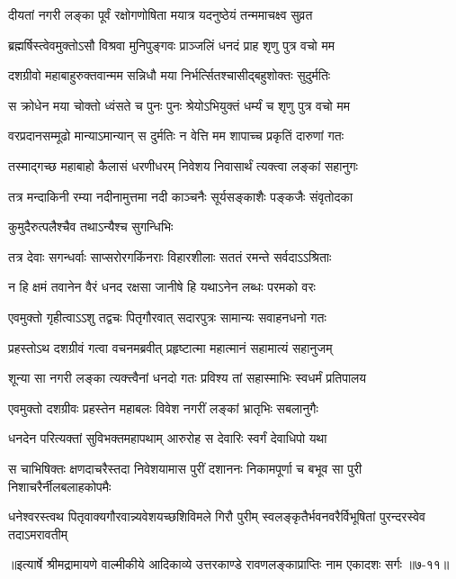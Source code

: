 \twolineshloka
{दीयतां नगरी लङ्का पूर्वं रक्षोगणोषिता}
{मयात्र यदनुष्ठेयं तन्ममाचक्ष्व सुव्रत} %

\twolineshloka
{ब्रह्मर्षिस्त्वेवमुक्तोऽसौ विश्रवा मुनिपुङ्गवः}
{प्राञ्जलिं धनदं प्राह शृणु पुत्र वचो मम} %

\twolineshloka
{दशग्रीवो महाबाहुरुक्तवान्मम सन्निधौ}
{मया निर्भर्त्सितश्चासीद्बहुशोक्तः सुदुर्मतिः} %

\twolineshloka
{स क्रोधेन मया चोक्तो ध्वंसते च पुनः पुनः}
{श्रेयोऽभियुक्तं धर्म्यं च शृणु पुत्र वचो मम} %

\twolineshloka
{वरप्रदानसम्मूढो मान्याऽमान्यान् स दुर्मतिः}
{न वेत्ति मम शापाच्च प्रकृतिं दारुणां गतः} %

\twolineshloka
{तस्माद्गच्छ महाबाहो कैलासं धरणीधरम्}
{निवेशय निवासार्थं त्यक्त्वा लङ्कां सहानुगः} %

\twolineshloka
{तत्र मन्दाकिनी रम्या नदीनामुत्तमा नदी}
{काञ्चनैः सूर्यसङ्काशैः पङ्कजैः संवृतोदका} %

\onelineshloka
{कुमुदैरुत्पलैश्चैव तथाऽन्यैश्च सुगन्धिभिः} %

\twolineshloka
{तत्र देवाः सगन्धर्वाः साप्सरोरगकिंनराः}
{विहारशीलाः सततं रमन्ते सर्वदाऽऽश्रिताः} %

\twolineshloka
{न हि क्षमं तवानेन वैरं धनद रक्षसा}
{जानीषे हि यथाऽनेन लब्धः परमको वरः} %

\twolineshloka
{एवमुक्तो गृहीत्वाऽऽशु तद्वचः पितृगौरवात्}
{सदारपुत्रः सामान्यः सवाहनधनो गतः} %

\twolineshloka
{प्रहस्तोऽथ दशग्रीवं गत्वा वचनमब्रवीत्}
{प्रहृष्टात्मा महात्मानं सहामात्यं सहानुजम्} %

\twolineshloka
{शून्या सा नगरी लङ्का त्यक्त्त्वैनां धनदो गतः}
{प्रविश्य तां सहास्माभिः स्वधर्मं प्रतिपालय} %

\twolineshloka
{एवमुक्तो दशग्रीवः प्रहस्तेन महाबलः}
{विवेश नगरीं लङ्कां भ्रातृभिः सबलानुगैः} %

\twolineshloka
{धनदेन परित्यक्तां सुविभक्तमहापथाम्}
{आरुरोह स देवारिः स्वर्गं देवाधिपो यथा} %

\twolineshloka
{स चाभिषिक्तः क्षणदाचरैस्तदा निवेशयामास पुरीं दशाननः}
{निकामपूर्णा च बभूव सा पुरी निशाचरैर्नीलबलाहकोपमैः} %

\twolineshloka
{धनेश्वरस्त्वथ पितृवाक्यगौरवान्न्यवेशयच्छशिविमले गिरौ पुरीम्}
{स्वलङ्कृतैर्भवनवरैर्विभूषितां पुरन्दरस्वेव तदाऽमरावतीम्} %


॥इत्यार्षे श्रीमद्रामायणे वाल्मीकीये आदिकाव्ये उत्तरकाण्डे रावणलङ्काप्राप्तिः नाम एकादशः सर्गः ॥७-११॥

